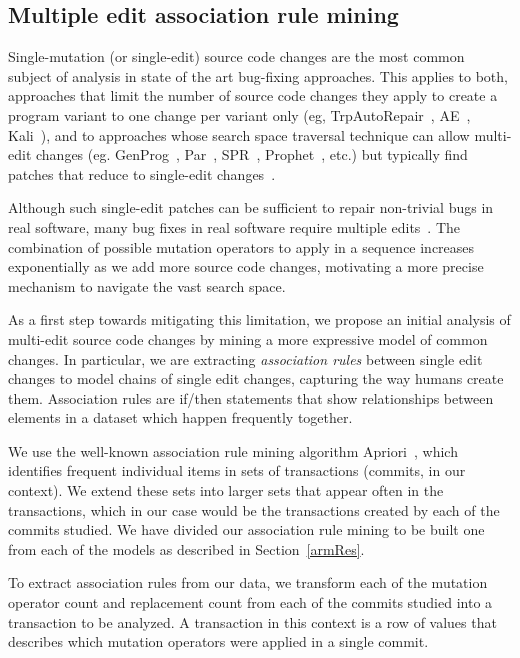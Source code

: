 \documentclass[conference]{IEEEtran}
\begin{document}
\subsection{Multiple edit association rule mining} 
\label{multEdit}

Single-mutation (or single-edit) source code changes are the most 
common subject of analysis in 
state of the art bug-fixing
approaches. This applies to both, approaches that limit the number of source 
code changes they apply to create a program variant to one change per variant 
only (eg, TrpAutoRepair~\cite{Qi13TrpAutoR}, AE~\cite{Weimer13}, Kali~\cite{Qi15}), and 
to approaches whose search space traversal technique can allow multi-edit 
changes (eg. GenProg~\cite{legoues12}, Par~\cite{kim2013}, SPR~\cite{fan15SPR},
Prophet~\cite{long16proph}, etc.) but typically find patches that reduce to
single-edit changes~\cite{arcuri11}.

Although such single-edit patches can be
sufficient to repair non-trivial bugs in real software, many bug fixes in real
software require multiple edits~\cite{zhong15,Soto15}. The combination of possible mutation
 operators to apply in a sequence increases exponentially as we add more source
 code changes, motivating a more precise mechanism to navigate the vast search
 space. 

As a first step towards mitigating this limitation, we propose 
an initial analysis of multi-edit 
source code changes by mining a more expressive model of common changes. In
particular, we are extracting \emph{association rules} between single edit changes 
to model chains of single edit changes, capturing the way humans create them.
Association rules are if/then statements that show relationships between elements in a dataset which happen frequently together.

We use the 
well-known association rule mining algorithm
Apriori~\cite{Agrawal94,Liu98,Zaki2000}, which identifies frequent 
individual items in sets of transactions (commits, in our context).  We extend these sets into 
larger sets that appear often in the transactions, which in our case would be the transactions created 
by each of the commits studied. We have divided our association rule mining to
be built one from each of the models as described in Section~\ref{armRes}. 

To extract association rules from  our data, we
transform each of the mutation operator count and replacement count from 
each of the commits studied into a transaction to be analyzed. A transaction 
in this context is a row of values that describes which mutation operators were applied in a single commit.
\end{document}
